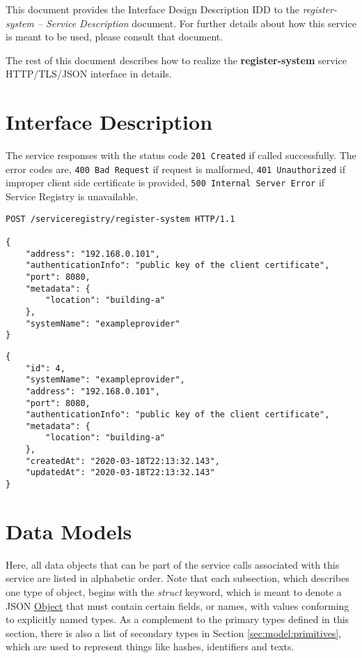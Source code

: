 \documentclass[a4paper]{arrowhead}
\newcommand{\fref}[1]{{\textcolor{ArrowheadBlue}{\hyperref[sec:functions:#1]{#1}}}}
\newcommand{\pref}[1]{{\textcolor{ArrowheadGrey}{\hyperref[sec:model:primitives:#1]{#1}}}}
\begin{document}
This document provides the Interface Design Description IDD to the \textit{register-system -- Service Description} document.
For further details about how this service is meant to be used, please consult that document.

The rest of this document describes how to realize the \textbf{register-system} service HTTP/TLS/JSON interface in details.

\newpage

\section{Interface Description}
\label{sec:functions}

The service responses with the status code \texttt{201
  Created} if called successfully. The error codes are, \texttt{400
  Bad Request} if request is malformed, \texttt{401 Unauthorized} if
improper client side certificate is provided, \texttt{500 Internal
  Server Error} if Service Registry is unavailable.

\begin{lstlisting}[language=http,label={lst:register},caption={A \fref{register-system} invocation.}]
POST /serviceregistry/register-system HTTP/1.1

{
    "address": "192.168.0.101",
    "authenticationInfo": "public key of the client certificate",
    "port": 8080,
    "metadata": {
        "location": "building-a"
    },
    "systemName": "exampleprovider"
}
\end{lstlisting}

\begin{lstlisting}[language=http,label={lst:register_response},caption={A \fref{register-system} response.}]
{
    "id": 4,
    "systemName": "exampleprovider",
    "address": "192.168.0.101",
    "port": 8080,
    "authenticationInfo": "public key of the client certificate",
    "metadata": {
        "location": "building-a"
    },
    "createdAt": "2020-03-18T22:13:32.143",
    "updatedAt": "2020-03-18T22:13:32.143"
}
\end{lstlisting}

\newpage

\section{Data Models}
\label{sec:model}

Here, all data objects that can be part of the service calls associated with this service are listed in alphabetic order.
Note that each subsection, which describes one type of object, begins with the \textit{struct} keyword, which is meant to denote a JSON \pref{Object} that must contain certain fields, or names, with values conforming to explicitly named types.
As a complement to the primary types defined in this section, there is also a list of secondary types in Section \ref{sec:model:primitives}, which are used to represent things like hashes, identifiers and texts.
\end{document}

